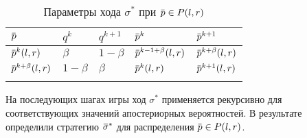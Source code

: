 {\begin{table}[htb]
  \centering
  \renewcommand{\arraystretch}{1.5}
  \captionsetup{width=17cm}
  \caption{Параметры хода $\sigma^*$ при $\p \in P(l, r)$}
  \label{ch3:tab:insider-strategy}
  \begin{tabular}{|P{3cm}||P{3cm}|P{3cm}|P{3cm}|P{3cm}|}
    \hline
    \hline
    $\p$                 & $q^k$     & $q^{k+1}$ & $\p^{k}$               & $\p^{k+1}$           \\ \hline
    $\p^k(l, r)$         & $\beta$   & $1-\beta$ & $\p^{k-1+\beta}(l, r)$ & $\p^{k+\beta}(l, r)$ \\ \hline
    $\p^{k+\beta}(l, r)$ & $1-\beta$ & $\beta$   & $\p^k(l, r)$           & $\p^{k+1}(l, r)$     \\
    \hline
    \hline
    \vspace{-2.5em}
  \end{tabular}
\end{table}

На последующих шагах игры ход $\sigma^*$ применяется рекурсивно для соответствующих значений апостериорных вероятностей.
В результате определили стратегию $\sigmav^*$ для распределения $\p \in P(l,r)$.

}

